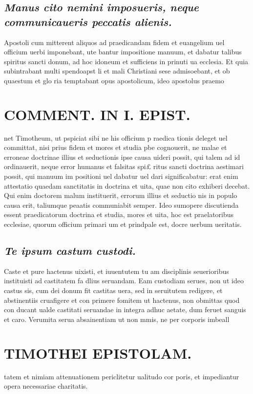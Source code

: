 \documentclass{article}
\begin{document}
\begin{pages}
\subsection*{\textit{Manus cito nemini imposueris, neque  communicaueris peccatis alienis. }}\pstart Apostoli cum mitterent aliquos ad praedicandam fidem et euangelium uel officium uerbi imponebant, ute bantur impositione manuum, et dabatur talibus spiritus sancti donum, ad hoc idoneum et sufficiens in prinuti ua ecclesia. Et quia subintrabant multi spendoapst li et mali Christiani sese admisoebant, et ob quaestum et glo ria temptabant opus apostolicum, ideo apostolus praemo  \pend
\section*{COMMENT. IN I. EPIST. }
\marginpar{[ p.148 ]}\pstart net Timotheum, ut pspiciat sibi ne his officium p raedica tionis deleget uel committat, nisi prius fidem et mores et studia pbe cognouerit, ne malae et erroneae doctrinae illius et seductionis ipse causa uideri possit, qui talem ad id ordinauerit, neque error humanus et falsitas spi£ ritus sancti doctrina aestimari possit, qui manuum im positioni uel dabatur uel dari significabatur: erat enim attestatio quaedam sanctitatis in doctrina et uita, quae non cito exhiberi decebat. Qui enim doctorem malum instituerit, errorum illius et seductio nis in populo causa erit, taliumque peaatis communiabit semper. Ideo sumopere discutienda essent praedicatorum doctrina et studia, mores et uita, hoc est praelatoribus ecclesiae, quorum officium primari um et prindpale est, docre uerbum ueritatis.  \pend
{}
{}
\subsection*{\textit{Te ipsum castum custodi. }}\pstart Caste et pure hactenus uixisti, et iuuentutem tu am disciplinis seuerioribus instituisti ad castitatem fa dlius seruandam. Eam custodiam serues, non ut ideo castus sis, cum dei donum fit castitas uera, sed in seruitutem redigere, et abstinentiis cruafigere et con primere fomitem ut hactenus, non obmittas quod con ducant ualde castitati seruandae in integra adhuc aetate, dum feruet sanguis et caro. Verumita serua absainentiam ut non mmis, ne per corporis imbeall  \pend
\section*{TIMOTHEI EPISTOLAM. }
\marginpar{[ p.149 ]}\pstart tatem et nimiam attenuationem periclitetur ualitudo cor poris, et impediantur opera necessariae charitatis.  \pend
{}
{}

\end{pages}
\end{document}
